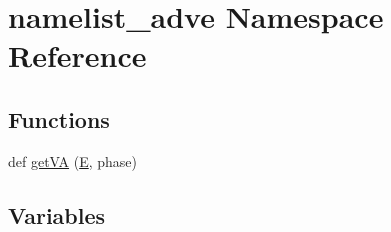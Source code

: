\hypertarget{namespacenamelist__adve}{}\section{namelist\+\_\+adve Namespace Reference}
\label{namespacenamelist__adve}
\subsection*{Functions}
\begin{DoxyCompactItemize}
\item 
def \hyperlink{namespacenamelist__adve_a015938c81605ab12161a793f73a3ab8e}{get\+VA} (\hyperlink{namespacenamelist__adve_a14da56ce4cf78f322671d70b408bcf00}{E}, phase)
\end{DoxyCompactItemize}
\subsection*{Variables}
